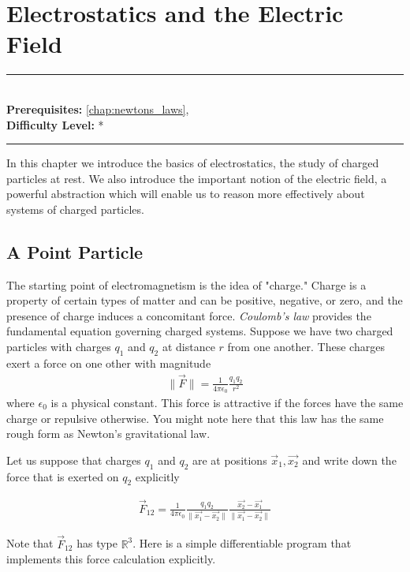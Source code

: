 \documentclass[book.tex]{subfiles}
\begin{document}
\chapter{Electrostatics and the Electric Field}

\label{chap:electrostatics}
\noindent\rule{11cm}{0.4pt} \\
\textbf{Prerequisites:} \autoref{chap:newtons_laws},  \\
\textbf{Difficulty Level:} * \\
\noindent\rule{11cm}{0.4pt}
\vspace{5mm}

In this chapter we introduce the basics of electrostatics, the study of charged particles at rest. We also introduce the important notion of the electric field, a powerful abstraction which will enable us to reason more effectively about systems of charged particles.

\section{A Point Particle}

The starting point of electromagnetism is the idea of "charge." Charge is a property of certain types of matter and can be positive, negative, or zero, and the presence of charge induces a concomitant force. \textit{Coulomb's law} provides the fundamental equation governing charged systems. Suppose we have two charged particles with charges $q_1$ and $q_2$ at distance $r$ from one another. These charges exert a force on one other with magnitude
\begin{align}
    \|\vec{F} \| = \frac{1}{4 \pi \epsilon_0} \frac{q_1q_2}{r^2}
    \label{eqn:coulomb_law}
\end{align}
where $\epsilon_0$ is a physical constant. This force is attractive if the forces have the same charge or repulsive otherwise. You might note here that this law has the same rough form as Newton's gravitational law.

Let us suppose that charges $q_1$ and $q_2$ are at positions $\vec{x}_1, \vec{x_2}$ and write down the force that is exerted on $q_2$ explicitly

\begin{align}
\vec{F}_{12} = \frac{1}{4 \pi \epsilon_0} \frac{q_1q_2}{\|\vec{x_1} - \vec{x_2}\|} \frac{\vec{x_2}-\vec{x_1}}{\|\vec{x_1} - \vec{x_2}\|}
\end{align}

Note that $\vec{F}_{12}$ has type $\mathbb{R}^3$. Here is a simple differentiable program that implements this force calculation explicitly.
\end{document}
